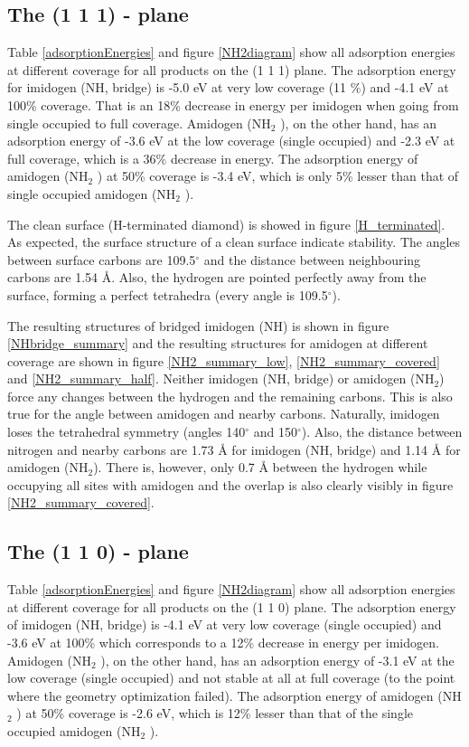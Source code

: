 \documentclass[12pt,a4paper]{article}
\begin{document}
\subsection{The (1 1 1) - plane}
Table \ref{adsorptionEnergies} and figure \ref{NH2diagram} show all adsorption energies at different coverage for all products on the (1 1 1) plane. The adsorption energy for imidogen (NH, bridge) is -5.0 eV at very low coverage (11 \%) and -4.1 eV at 100\% coverage. That is an 18\% decrease in energy per imidogen when going from single occupied to full coverage. Amidogen (NH$_2$ ), on the other hand, has an adsorption energy of -3.6 eV at the low coverage (single occupied) and -2.3 eV at full coverage, which is  a 36\% decrease in energy. The adsorption energy of amidogen (NH$_2$ ) at 50\% coverage is -3.4 eV, which is only 5\% lesser than that of single occupied amidogen (NH$_2$ ).

The clean surface (H-terminated diamond) is showed in figure \ref{H_terminated}. As expected, the surface structure of a clean surface indicate stability. The angles between surface carbons are 109.5$^{\circ}$ and the distance between neighbouring carbons are 1.54 Å. Also, the hydrogen are pointed perfectly away from the surface, forming a perfect tetrahedra (every angle is 109.5$^{\circ}$).

The resulting structures of bridged imidogen (NH) is shown in figure \ref{NHbridge_summary} and the resulting structures for amidogen at different coverage are shown in figure \ref{NH2_summary_low}, \ref{NH2_summary_covered} and \ref{NH2_summary_half}.  Neither imidogen (NH, bridge) or amidogen (NH$_2$) force any changes between the hydrogen and the remaining carbons. This is also true for the angle between amidogen and nearby carbons. Naturally, imidogen loses the tetrahedral symmetry (angles 140$^{\circ}$ and 150$^{\circ}$). Also, the distance between nitrogen and nearby carbons are 1.73 Å for imidogen (NH, bridge) and 1.14 Å for amidogen (NH$_2$). There is, however, only 0.7 Å between the hydrogen while occupying all sites with amidogen and the overlap is also clearly visibly in figure \ref{NH2_summary_covered}.

\subsection{The (1 1 0) - plane}
Table \ref{adsorptionEnergies} and figure \ref{NH2diagram} show all adsorption energies at different coverage for all products on the (1 1 0) plane. The adsorption energy of imidogen (NH, bridge) is -4.1 eV at very low coverage (single occupied) and -3.6 eV at 100\% which corresponds to a 12\% decrease in energy per imidogen. Amidogen (NH$_2$ ), on the other hand, has an adsorption energy of -3.1 eV at the low coverage (single occupied) and not stable at all at full coverage (to the point where the geometry optimization failed). The adsorption energy of amidogen (NH$_2$ ) at 50\% coverage is -2.6 eV, which is 12\% lesser than that of the single occupied amidogen (NH$_2$ ). 
\end{document}
